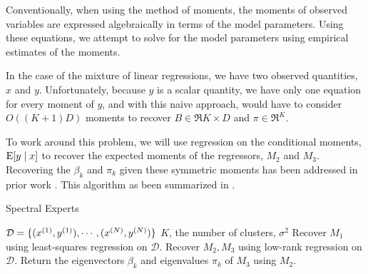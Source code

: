 Conventionally, when using the method of moments, the moments of
observed variables are expressed algebraically in terms of the model
parameters. Using these equations, we attempt to solve for the model
parameters using empirical estimates of the moments. 

In the case of the mixture of linear regressions, we have two observed
quantities, $x$ and $y$. Unfortunately, because $y$ is a scalar
quantity, we have only one equation for every moment of $y$, and with
this naive approach, would have to consider $O( (K+1) D)$ moments to
recover $B \in \Re{K \times D}$ and $\pi \in \Re^K$. 

% 

To work around this problem, we will use regression on the conditional
moments, $\operatorname{E}[y \mid x]$ to recover the expected moments of the regressors,
$M_2$ and $M_3$. Recovering the $\beta_k$ and $\pi_k$ given these
symmetric moments has been addressed in prior work
\citep{AnandkumarHsuKakade2012, AnandkumarGeHsu2012}.  This algorithm as
been summarized in .

\begin{algorithm}[t]
  \caption{Spectral Experts}
  \label{algo:spectral-experts}
  \begin{algorithmic}[1]
    \REQUIRE $\mathcal{D} = \{ (x^{(1)}, y^{(1)}), \cdots, (x^{(N)}, y^{(N)}) \}$
    \REQUIRE $K$, the number of clusters, $\sigma^2$ 
    \STATE Recover $M_1$ using least-squares regression on $\mathcal{D}$.
    \STATE Recover $M_2, M_3$ using low-rank regression on $\mathcal{D}$.
    \STATE Return the eigenvectors $\beta_k$ and eigenvalues $\pi_k$ of $M_3$ using $M_2$.
  \end{algorithmic}
\end{algorithm}

